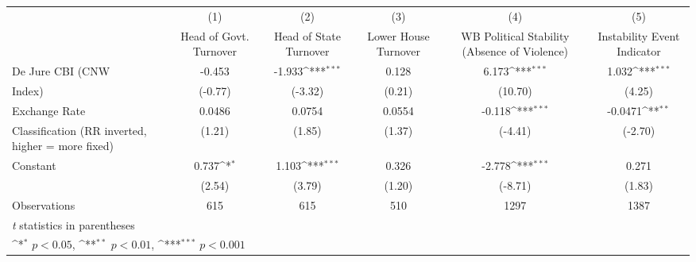 {
\def\sym#1{\ifmmode^{#1}\else\(^{#1}\)\fi}
\begin{tabular}{l*{5}{c}}
\toprule
                &\multicolumn{1}{c}{(1)}&\multicolumn{1}{c}{(2)}&\multicolumn{1}{c}{(3)}&\multicolumn{1}{c}{(4)}&\multicolumn{1}{c}{(5)}\\
                &\multicolumn{1}{c}{Head of Govt. Turnover}&\multicolumn{1}{c}{Head of State Turnover}&\multicolumn{1}{c}{Lower House Turnover}&\multicolumn{1}{c}{WB Political Stability (Absence of Violence)}&\multicolumn{1}{c}{Instability Event Indicator}\\
\midrule
De Jure CBI (CNW&   -0.453         &   -1.933\sym{***}&    0.128         &    6.173\sym{***}&    1.032\sym{***}\\
Index)          &  (-0.77)         &  (-3.32)         &   (0.21)         &  (10.70)         &   (4.25)         \\
\addlinespace
Exchange Rate   &   0.0486         &   0.0754         &   0.0554         &   -0.118\sym{***}&  -0.0471\sym{**} \\
Classification (RR inverted, higher = more fixed)&   (1.21)         &   (1.85)         &   (1.37)         &  (-4.41)         &  (-2.70)         \\
\addlinespace
Constant        &    0.737\sym{*}  &    1.103\sym{***}&    0.326         &   -2.778\sym{***}&    0.271         \\
                &   (2.54)         &   (3.79)         &   (1.20)         &  (-8.71)         &   (1.83)         \\
\midrule
Observations    &      615         &      615         &      510         &     1297         &     1387         \\
\bottomrule
\multicolumn{6}{l}{\footnotesize \textit{t} statistics in parentheses}\\
\multicolumn{6}{l}{\footnotesize \sym{*} \(p<0.05\), \sym{**} \(p<0.01\), \sym{***} \(p<0.001\)}\\
\end{tabular}
}
